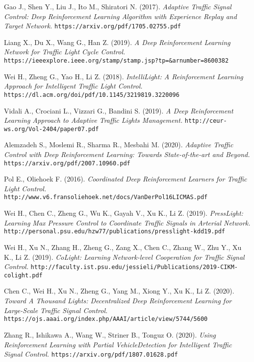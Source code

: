 \begin{thebibliography}{99}
Gao J., Shen Y., Liu J., Ito M., Shiratori N. (2017).
\textit{Adaptive Traffic Signal Control: Deep Reinforcement Learning Algorithm with Experience Replay and Target Network.}
\texttt{https://arxiv.org/pdf/1705.02755.pdf}

Liang X., Du X., Wang G., Han Z. (2019).
\textit{A Deep Reinforcement Learning Network for Traffic Light Cycle Control.}
\texttt{https://ieeexplore.ieee.org/stamp/stamp.jsp?tp=\&arnumber=8600382}

Wei H., Zheng G., Yao H., Li Z. (2018).
\textit{IntelliLight: A Reinforcement Learning Approach for Intelligent Traffic Light Control.}
\texttt{https://dl.acm.org/doi/pdf/10.1145/3219819.3220096}

Vidali A., Crociani L., Vizzari G., Bandini S. (2019).
\textit{A Deep Reinforcement Learning Approach to Adaptive Traffic Lights Management.}
\texttt{http://ceur-ws.org/Vol-2404/paper07.pdf}

Alemzadeh S., Moslemi R., Sharma R., Mesbahi M. (2020).
\textit{Adaptive Traffic Control with Deep Reinforcement Learning: Towards State-of-the-art and Beyond.}
\texttt{https://arxiv.org/pdf/2007.10960.pdf}

Pol E., Oliehoek F. (2016).
\textit{Coordinated Deep Reinforcement Learners for Traffic Light Control.}
\texttt{http://www.v6.fransoliehoek.net/docs/VanDerPol16LICMAS.pdf}

Wei H., Chen C., Zheng G., Wu K., Gayah V., Xu K., Li Z. (2019).
\textit{PressLight: Learning Max Pressure Control to Coordinate Traffic Signals in Arterial Network.}
\texttt{http://personal.psu.edu/hzw77/publications/presslight-kdd19.pdf}

Wei H., Xu N., Zhang H., Zheng G., Zang X., Chen C., Zhang W., Zhu Y., Xu K., Li Z. (2019).
\textit{CoLight: Learning Network-level Cooperation for Traffic Signal Control.}
\texttt{http://faculty.ist.psu.edu/jessieli/Publications/2019-CIKM-colight.pdf}

Chen C., Wei H., Xu N., Zheng G., Yang M., Xiong Y., Xu K., Li Z. (2020).
\textit{Toward A Thousand Lights: Decentralized Deep Reinforcement Learning for Large-Scale Traffic Signal Control.}
\texttt{https://ojs.aaai.org/index.php/AAAI/article/view/5744/5600}

Zhang R., Ishikawa A., Wang W., Striner B., Tonguz O. (2020).
\textit{Using Reinforcement Learning with Partial VehicleDetection for Intelligent Traffic Signal Control.}
\texttt{https://arxiv.org/pdf/1807.01628.pdf}


\end{thebibliography}
